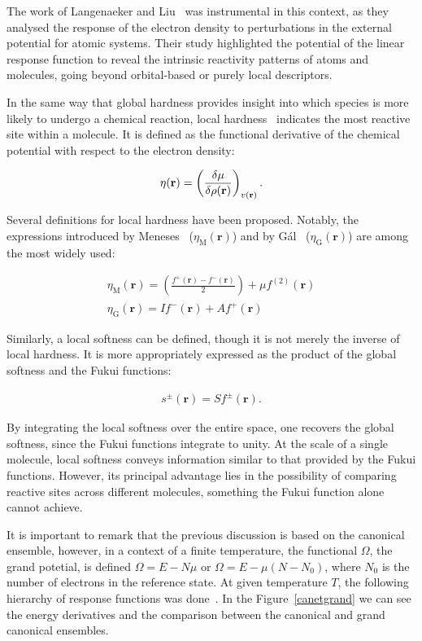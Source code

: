 The work of Langenaeker and Liu~\cite{Langenaeker2001} was instrumental in this context, as
they analysed the response of the electron density to perturbations in the
external potential for atomic systems. Their study highlighted the potential of
the linear response function to reveal the intrinsic reactivity patterns of
atoms and molecules, going beyond orbital-based or purely local descriptors.

In the same way that global hardness provides insight into which species is
more likely to undergo a chemical reaction, local hardness~\cite{Yang1985}
indicates the most reactive site within a molecule. It is defined as the
functional derivative of the chemical potential with respect to the electron
density:

\begin{align}
  \eta(\mathbf{r}) =
    \left(\fdv{\mu}{\rho(\mathbf{r})}\right)_{v(\mathbf{r})}.
\end{align}

\pagebreak
Several definitions for local hardness have been proposed. Notably, the
expressions introduced by Meneses~\cite{Meneses2004}
($\eta_\mathrm{M}(\mathbf{r})$) and by Gál~\cite{Gal2011}
($\eta_\mathrm{G}(\mathbf{r})$) are among the most widely used:

\begin{gather}
  \eta_\mathrm{M}(\mathbf{r}) =
    \left(\frac{f^+(\mathbf{r}) - f^-(\mathbf{r})}{2}\right) +
      \mu f^{(2)}(\mathbf{r}) \\
  \eta_\mathrm{G}(\mathbf{r}) =
    If^-(\mathbf{r}) + Af^+(\mathbf{r})
\end{gather}

Similarly, a local softness can be defined, though it is not merely the inverse
of local hardness. It is more appropriately expressed as the product of the
global softness and the Fukui functions:

\begin{align}
  s^\pm(\mathbf{r}) = Sf^\pm(\mathbf{r}).
\end{align}

By integrating the local softness over the entire space, one recovers the global
softness, since the Fukui functions integrate to unity. At the scale of a single
molecule, local softness conveys information similar to that provided by the
Fukui functions. However, its principal advantage lies in the possibility of
comparing reactive sites across different molecules, something the Fukui function
alone cannot achieve.

It is important to remark that the previous discussion is based on the
canonical ensemble, however, in a context of a finite temperature, the
functional $\Omega$, the grand potetial, is defined $\Omega = E - N\mu$ or
$\Omega = E - \mu (N - N_0)$, where $N_0$ is the number of electrons in the
reference state. At given temperature $T$, the following hierarchy of response
functions was done~\cite{Chermette1999}. In the Figure~\ref{canetgrand} we can
see the energy derivatives and the comparison between the canonical and grand
canonical ensembles.

